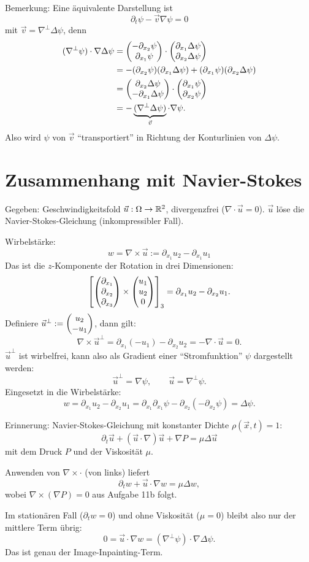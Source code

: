 Bemerkung: Eine äquivalente Darstellung ist
\[ \partial_t \psi - \vec{v} \nabla \psi = 0 \]
mit $\vec{v} = \nabla^\perp \Delta \psi$, denn
\begin{align*}
  (\nabla^\perp \psi) \cdot \nabla \Delta \psi
  &= \begin{pmatrix}-\partial_{x_2} \psi \\ \partial_{x_1} \psi\end{pmatrix}
  \cdot \begin{pmatrix}\partial_{x_1} \Delta \psi \\ \partial_{x_2} \Delta\psi\end{pmatrix} \\
  &= -(\partial_{x_2} \psi)(\partial_{x_1} \Delta \psi)
    +(\partial_{x_1} \psi)(\partial_{x_2} \Delta \psi) \\
  &= \begin{pmatrix}\partial_{x_2} \Delta \psi \\ -\partial_{x_1} \Delta \psi\end{pmatrix}
  \cdot \begin{pmatrix}\partial_{x_1} \psi \\ \partial_{x_2} \psi\end{pmatrix} \\
  &= - \underbrace{(\nabla^\perp \Delta \psi)}_{\vec{v}} \cdot \nabla \psi.
\end{align*}
Also wird $\psi$ von $\vec{v}$ ``transportiert'' in Richtung der Konturlinien
von $\Delta \psi$.

\section*{Zusammenhang mit Navier-Stokes}
Gegeben: Geschwindigkeitsfold $\vec{u} : \Omega \to \mathbb{R}^2$, divergenzfrei
($\nabla \cdot \vec{u} = 0$). $\vec{u}$ löse die Navier-Stokes-Gleichung
(inkompressibler Fall).

Wirbelstärke:
\[ w = \nabla \times \vec{u} := \partial_{x_1} u_2 - \partial_{x_1} u_1 \]
Das ist die $z$-Komponente der Rotation in drei Dimensionen:
\[ \left[ \begin{pmatrix}\partial_{x_1} \\ \partial_{x_2} \\ \partial_{x_3}\end{pmatrix} \times
    \begin{pmatrix} u_1 \\ u_2 \\ 0 \end{pmatrix} \right]_3
  = \partial_{x_1} u_2 - \partial_{x_2} u_1. \]
Definiere $\vec{u}^\perp := \begin{pmatrix}u_2 \\ -u_1\end{pmatrix}$, dann gilt:
\[ \nabla \times \vec{u}^\perp = \partial_{x_1}(-u_1) - \partial_{x_2} u_2 =
  - \nabla \cdot \vec{u} = 0. \]
$\vec{u}^\perp$ ist wirbelfrei, kann also als Gradient einer ``Stromfunktion''
$\psi$ dargestellt werden:
\[ \vec{u}^\perp = \nabla \psi, \qquad \vec{u} = \nabla^\perp \psi. \]
Eingesetzt in die Wirbelstärke:
\[ w = \partial_{x_1} u_2 - \partial_{x_2} u_1 = \partial_{x_1} \partial_{x_1}
  \psi - \partial_{x_2} (-\partial_{x_2} \psi) = \Delta \psi. \]

Erinnerung: Navier-Stokes-Gleichung mit konstanter Dichte $\rho(\vec{x},t) = 1$:
\[ \partial_t \vec{u} + (\vec{u} \cdot \nabla) \vec{u} + \nabla P = \mu \Delta
  \vec{u} \]
mit dem Druck $P$ und der Viskosität $\mu$.

Anwenden von $\nabla \times \cdot$ (von links) liefert
\[ \partial_t w + \vec{u} \cdot \nabla w = \mu \Delta w, \]
wobei $\nabla \times (\nabla P) = 0$ aus Aufgabe 11b folgt.

Im stationären Fall ($\partial_t w = 0$) und ohne Viskosität ($\mu = 0$) bleibt
also nur der mittlere Term übrig:
\[ 0 = \vec{u} \cdot \nabla w = (\nabla^\perp \psi) \cdot \nabla \Delta \psi. \]
Das ist genau der Image-Inpainting-Term.